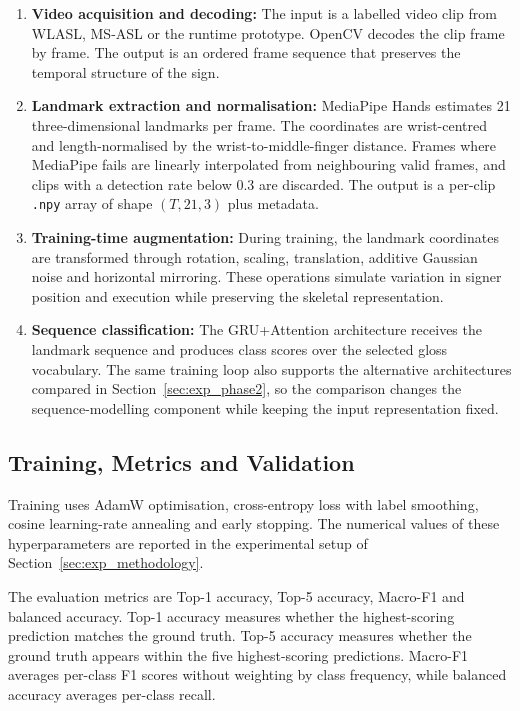 \begin{enumerate}
    \item \textbf{Video acquisition and decoding:} The input is a labelled video clip from WLASL,
          MS-ASL or the runtime prototype. OpenCV decodes the clip frame by frame. The output is an
          ordered frame sequence that preserves the temporal structure of the sign.
    \item \textbf{Landmark extraction and normalisation:} MediaPipe Hands estimates 21
          three-dimensional landmarks per frame. The coordinates are wrist-centred and
          length-normalised by the wrist-to-middle-finger distance. Frames where MediaPipe fails are
          linearly interpolated from neighbouring valid frames, and clips with a detection rate
          below 0.3 are discarded. The output is a per-clip \texttt{.npy} array of shape
          $(T, 21, 3)$ plus metadata.
    \item \textbf{Training-time augmentation:} During training, the landmark coordinates are
          transformed through rotation, scaling, translation, additive Gaussian noise and horizontal
          mirroring. These operations simulate variation in signer position and execution while
          preserving the skeletal representation.
    \item \textbf{Sequence classification:} The GRU+Attention architecture receives the landmark
          sequence and produces class scores over the selected gloss vocabulary. The same training
          loop also supports the alternative architectures compared in
          Section~\ref{sec:exp_phase2}, so the comparison changes the sequence-modelling component
          while keeping the input representation fixed.
\end{enumerate}

\subsection{Training, Metrics and Validation}

Training uses AdamW optimisation, cross-entropy loss with label smoothing, cosine learning-rate
annealing and early stopping. The numerical values of these hyperparameters are reported in the
experimental setup of Section~\ref{sec:exp_methodology}.

The evaluation metrics are Top-1 accuracy, Top-5 accuracy, Macro-F1 and balanced accuracy. Top-1
accuracy measures whether the highest-scoring prediction matches the ground truth. Top-5 accuracy
measures whether the ground truth appears within the five highest-scoring predictions. Macro-F1
averages per-class F1 scores without weighting by class frequency, while balanced accuracy averages
per-class recall.

